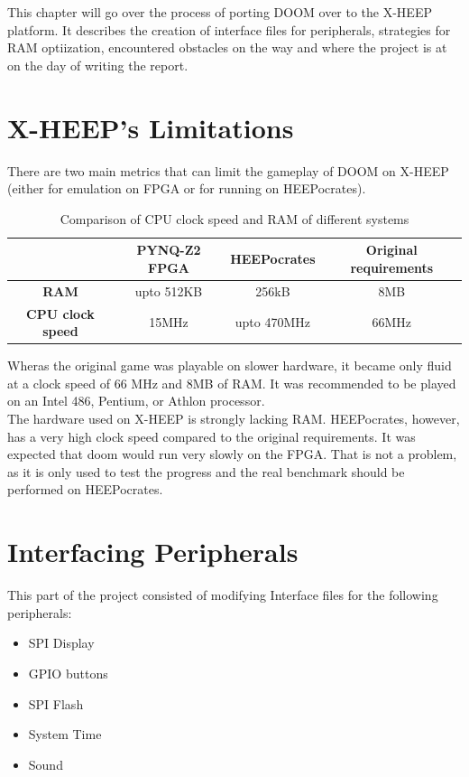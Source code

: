This chapter will go over the process of porting DOOM over to the X-HEEP platform. It describes the creation of interface files for peripherals, strategies for RAM optiization, encountered obstacles on the way and where the project is at on the day of writing the report. 

\section{X-HEEP's Limitations}
There are two main metrics that can limit the gameplay of DOOM on X-HEEP (either for emulation on FPGA or for running on HEEPocrates).

\begin{table}[ht]
    \centering
    \begin{tabular}{|c|c|c|c|}
        \hline
         & \textbf{PYNQ-Z2 FPGA} & \textbf{HEEPocrates} & \textbf{Original requirements} \\
        \hline
        \textbf{RAM} & upto 512KB & 256kB & 8MB \\
        \hline
        \textbf{CPU clock speed} & 15MHz & upto 470MHz & 66MHz \\
        \hline
    \end{tabular}
    \caption{Comparison of CPU clock speed and RAM of different systems}
    \label{table:systemPerformance}
\end{table}

Wheras the original game was playable on slower hardware, it became only fluid at a clock speed of 66 MHz and 8MB of RAM. It was recommended to be played on an Intel 486, Pentium, or Athlon processor. \cite{doomSystemRequirements}  \\
The hardware used on X-HEEP is strongly lacking RAM. HEEPocrates, however, has a very high clock speed compared to the original requirements. It was expected that doom would run very slowly on the FPGA. That is not a problem, as it is only used to test the progress and the real benchmark should be performed on HEEPocrates.

\section{Interfacing Peripherals}

This part of the project consisted of modifying Interface files for the following peripherals: \\
\begin{itemize}
   \item SPI Display
   \item GPIO buttons
   \item SPI Flash
   \item System Time
   \item Sound
\end{itemize}

